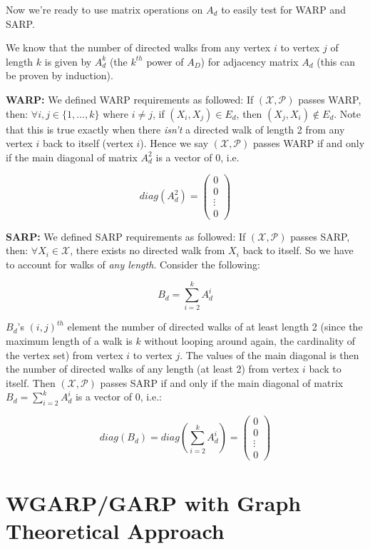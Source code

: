 \documentclass{article} %
\begin{document}
Now we're ready to use matrix operations on $A_d$ to easily test for WARP and SARP.


We know that the number of directed walks from any vertex $i$ to vertex $j$ of length $k$ is given by $A^k_d$ (the $k^{th}$ power of $A_D$)  for adjacency matrix $A_d$ (this can be proven by induction). 


\textbf{WARP:} We defined WARP requirements as followed: If $(\mathcal{X},\mathcal{P})$ passes WARP, then: $\forall i,j\in\{1,\dots,k\}$ where $i\not=j$, if $(X_i,X_j)\in E_d$, then $(X_j, X_i)\not\in E_d$. Note that this is true exactly when there \textit{isn't} a directed walk of length 2 from any vertex $i$ back to itself (vertex $i$). Hence we say $(\mathcal{X},\mathcal{P})$ passes WARP if and only if the main diagonal of matrix $A_d^2$ is a vector of 0, i.e.

\[
diag(A_d^2) =
 \begin{pmatrix}
  0 \\
  0 \\
  \vdots \\
  0
 \end{pmatrix}
\]

\textbf{SARP:} We defined SARP requirements as followed: If $(\mathcal{X},\mathcal{P})$ passes SARP, then: $\forall X_i \in \mathcal{X}$, there exists no directed walk from $X_i$ back to itself. So we have to account for walks of \textit{any length}. Consider the following:

$$B_d=\sum_{i=2}^{k}A_d^i$$

$B_d$'s $(i,j)^{th}$ element the number of directed walks of at least length 2 (since the maximum length of a walk is $k$ without looping around again, the cardinality of the vertex set) from vertex $i$ to vertex $j$. The values of the main diagonal is then the number of directed walks of any length (at least 2) from vertex $i$ back to itself. Then $(\mathcal{X},\mathcal{P})$ passes SARP if and only if the main diagonal of matrix $B_d=\sum_{i=2}^{k}A_d^i$ is a vector of 0, i.e.:

\[
diag(B_d) = diag(\sum_{i=2}^{k}A_d^i)=
 \begin{pmatrix}
  0 \\
  0 \\
  \vdots \\
  0
 \end{pmatrix}
\]

\section{WGARP/GARP with Graph Theoretical Approach}
\end{document}
